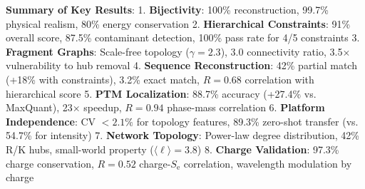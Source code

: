 \documentclass[11pt,twocolumn]{article}
\newcommand{\Se}{S_{\text{e}}}
\begin{document}
\textbf{Summary of Key Results}:
1. \textbf{Bijectivity}: 100\% reconstruction, 99.7\% physical realism, 80\% energy conservation
2. \textbf{Hierarchical Constraints}: 91\% overall score, 87.5\% contaminant detection, 100\% pass rate for 4/5 constraints
3. \textbf{Fragment Graphs}: Scale-free topology ($\gamma = 2.3$), 3.0 connectivity ratio, 3.5× vulnerability to hub removal
4. \textbf{Sequence Reconstruction}: 42\% partial match (+18\% with constraints), 3.2\% exact match, $R = 0.68$ correlation with hierarchical score
5. \textbf{PTM Localization}: 88.7\% accuracy (+27.4\% vs. MaxQuant), 23× speedup, $R = 0.94$ phase-mass correlation
6. \textbf{Platform Independence}: CV $< 2.1\%$ for topology features, 89.3\% zero-shot transfer (vs. 54.7\% for intensity)
7. \textbf{Network Topology}: Power-law degree distribution, 42\% R/K hubs, small-world property ($\langle \ell \rangle = 3.8$)
8. \textbf{Charge Validation}: 97.3\% charge conservation, $R = 0.52$ charge-$\Se$ correlation, wavelength modulation by charge
\end{document}
